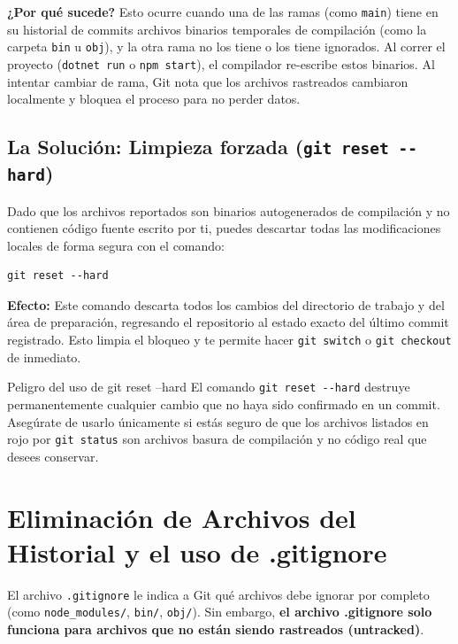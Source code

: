 \documentclass[
10pt, %
a4paper, %
oneside, %
headinclude,footinclude, %
BCOR5mm, %
]{scrartcl}
\begin{document}
\textbf{¿Por qué sucede?} Esto ocurre cuando una de las ramas (como \texttt{main}) tiene en su historial de commits archivos binarios temporales de compilación (como la carpeta \texttt{bin} u \texttt{obj}), y la otra rama no los tiene o los tiene ignorados. Al correr el proyecto (\texttt{dotnet run} o \texttt{npm start}), el compilador re-escribe estos binarios. Al intentar cambiar de rama, Git nota que los archivos rastreados cambiaron localmente y bloquea el proceso para no perder datos.

\subsection{La Solución: Limpieza forzada (\texttt{git reset -{}-hard})}
Dado que los archivos reportados son binarios autogenerados de compilación y no contienen código fuente escrito por ti, puedes descartar todas las modificaciones locales de forma segura con el comando:

\begin{lstlisting}[language=DOS]
git reset --hard
\end{lstlisting}

\textbf{Efecto:} Este comando descarta todos los cambios del directorio de trabajo y del área de preparación, regresando el repositorio al estado exacto del último commit registrado. Esto limpia el bloqueo y te permite hacer \texttt{git switch} o \texttt{git checkout} de inmediato.

\begin{ErrorBox}{Peligro del uso de git reset --hard}
	El comando \texttt{git reset -{}-hard} destruye permanentemente cualquier cambio que no haya sido confirmado en un commit. Asegúrate de usarlo únicamente si estás seguro de que los archivos listados en rojo por \texttt{git status} son archivos basura de compilación y no código real que desees conservar.
\end{ErrorBox}

\newpage
\section{Eliminación de Archivos del Historial y el uso de .gitignore}

El archivo \texttt{.gitignore} le indica a Git qué archivos debe ignorar por completo (como \texttt{node\_modules/}, \texttt{bin/}, \texttt{obj/}). Sin embargo, \textbf{el archivo .gitignore solo funciona para archivos que no están siendo rastreados (untracked)}.
\end{document}
